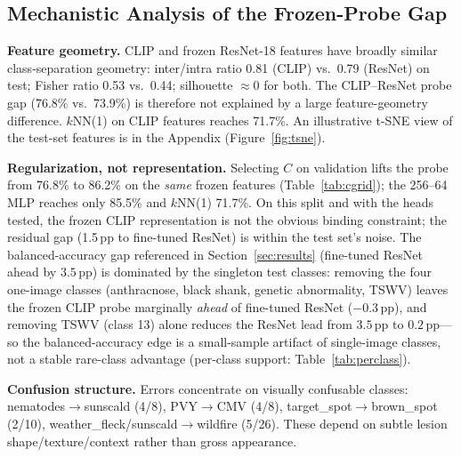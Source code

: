 \documentclass[10pt,a4paper]{article}
\begin{document}
\subsection{Mechanistic Analysis of the Frozen-Probe Gap}
\label{sec:why}

\textbf{Feature geometry.} CLIP and frozen ResNet-18 features have broadly similar class-separation geometry: inter/intra ratio 0.81 (CLIP) vs.\ 0.79 (ResNet) on test; Fisher ratio 0.53 vs.\ 0.44; silhouette $\approx$0 for both. The CLIP--ResNet probe gap (76.8\% vs.\ 73.9\%) is therefore not explained by a large feature-geometry difference. $k$NN(1) on CLIP features reaches 71.7\%. An illustrative t-SNE view of the test-set features is in the Appendix (Figure~\ref{fig:tsne}).

\textbf{Regularization, not representation.} Selecting $C$ on validation lifts the probe from 76.8\% to 86.2\% on the \emph{same} frozen features (Table~\ref{tab:cgrid}); the 256--64 MLP reaches only 85.5\% and $k$NN(1) 71.7\%. On this split and with the heads tested, the frozen CLIP representation is not the obvious binding constraint; the residual gap (1.5\,pp to fine-tuned ResNet) is within the test set's noise. The balanced-accuracy gap referenced in Section~\ref{sec:results} (fine-tuned ResNet ahead by $3.5$\,pp) is dominated by the singleton test classes: removing the four one-image classes (anthracnose, black shank, genetic abnormality, TSWV) leaves the frozen CLIP probe marginally \emph{ahead} of fine-tuned ResNet ($-0.3$\,pp), and removing TSWV (class 13) alone reduces the ResNet lead from $3.5$\,pp to $0.2$\,pp---so the balanced-accuracy edge is a small-sample artifact of single-image classes, not a stable rare-class advantage (per-class support: Table~\ref{tab:perclass}).

\textbf{Confusion structure.} Errors concentrate on visually confusable classes: nematodes$\to$sunscald (4/8), PVY$\to$CMV (4/8), target\_spot$\to$brown\_spot (2/10), weather\_fleck/sunscald$\to$wildfire (5/26). These depend on subtle lesion shape/texture/context rather than gross appearance.
\end{document}
